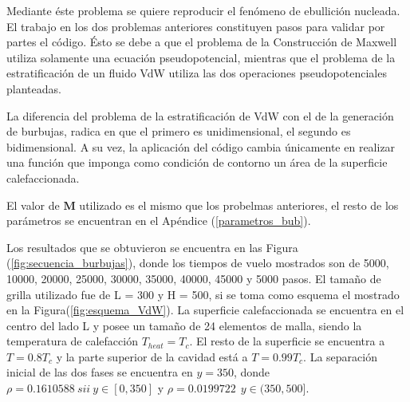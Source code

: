 Mediante éste problema se quiere reproducir el fenómeno de ebullición nucleada. El trabajo en los dos problemas anteriores constituyen pasos para validar por partes el código. Ésto se debe a que el problema de la Construcción de Maxwell utiliza solamente una ecuación pseudopotencial, mientras que el problema de la estratificación de un fluido VdW utiliza las dos operaciones pseudopotenciales planteadas.

La diferencia del problema de la estratificación de VdW con el de la generación de burbujas, radica en que el primero es unidimensional, el segundo es bidimensional. A su vez, la aplicación del código cambia únicamente en realizar una función que imponga como condición de contorno un área de la superficie calefaccionada.

El valor de $\mathbf{M}$ utilizado es el mismo que los probelmas anteriores, el resto de los parámetros se encuentran en el Apéndice (\ref{parametros_bub}).

Los resultados que se obtuvieron se encuentra en las Figura (\ref{fig:secuencia_burbujas}), donde los tiempos de vuelo mostrados son de 5000, 10000, 20000, 25000, 30000, 35000, 40000, 45000 y 5000 pasos. El tamaño de grilla utilizado fue de L = 300 y H = 500, si se toma como esquema el mostrado en la Figura(\ref{fig:esquema_VdW}). La superficie calefaccionada se encuentra en el centro del lado L y posee un tamaño de 24 elementos de malla, siendo la temperatura de calefacción $T_{heat} = T_c$. El resto de la superficie se encuentra a $T = 0.8 T_c$ y la parte superior de la cavidad está a $T = 0.99 T_c$. La separación inicial de las dos fases se encuentra en $y = 350$, donde $\rho = 0.1610588 \> sii \> y \in [0,350]$ y $\rho = 0.0199722 \>\> y \in (350,500]$.

